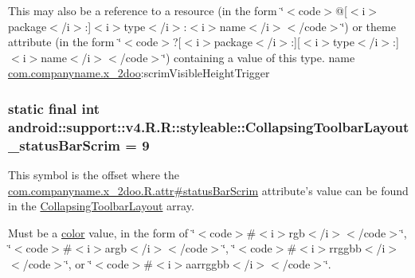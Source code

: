 This may also be a reference to a resource (in the form \char`\"{}$<$code$>$@\mbox{[}$<$i$>$package$<$/i$>$:\mbox{]}$<$i$>$type$<$/i$>$:$<$i$>$name$<$/i$>$$<$/code$>$\char`\"{}) or theme attribute (in the form \char`\"{}$<$code$>$?\mbox{[}$<$i$>$package$<$/i$>$:\mbox{]}\mbox{[}$<$i$>$type$<$/i$>$:\mbox{]}$<$i$>$name$<$/i$>$$<$/code$>$\char`\"{}) containing a value of this type.  name \hyperlink{namespacecom_1_1companyname_1_1x__2doo}{com.companyname.x\_\-2doo}:scrimVisibleHeightTrigger \hypertarget{classandroid_1_1support_1_1v4_1_1_r_1_1styleable_6a591832849ef0da0ef6a52fc4f0b623}{
\subsubsection[{CollapsingToolbarLayout\_\-statusBarScrim}]{\setlength{\rightskip}{0pt plus 5cm}static final int android::support::v4.R.R::styleable::CollapsingToolbarLayout\_\-statusBarScrim = 9}}
\label{classandroid_1_1support_1_1v4_1_1_r_1_1styleable_6a591832849ef0da0ef6a52fc4f0b623}


This symbol is the offset where the \hyperlink{classcom_1_1companyname_1_1x__2doo_1_1_r_1_1attr_6175b14225e12b675c99924b7c9b602b}{com.companyname.x\_\-2doo.R.attr\#statusBarScrim} attribute's value can be found in the \hyperlink{classandroid_1_1support_1_1v4_1_1_r_1_1styleable_aa101903fcf4b45a3b7fee0a0abc5ea8}{CollapsingToolbarLayout} array.

Must be a \hyperlink{classandroid_1_1support_1_1v4_1_1_r_1_1color}{color} value, in the form of \char`\"{}$<$code$>$\#$<$i$>$rgb$<$/i$>$$<$/code$>$\char`\"{}, \char`\"{}$<$code$>$\#$<$i$>$argb$<$/i$>$$<$/code$>$\char`\"{}, \char`\"{}$<$code$>$\#$<$i$>$rrggbb$<$/i$>$$<$/code$>$\char`\"{}, or \char`\"{}$<$code$>$\#$<$i$>$aarrggbb$<$/i$>$$<$/code$>$\char`\"{}. 

